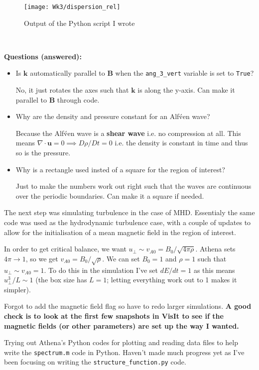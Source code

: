 \documentclass[12pt,letterpaper]{article}
\newcommand{\B}[1]{\mathbf{#1}}
\begin{document}
  \begin{figure}[!h]
    \centering
    \texttt{[image: Wk3/dispersion\_rel]}
    \caption{Output of the Python script I wrote}
    \label{fig:disp_rel}
  \end{figure}

  \

  \textbf{Questions (answered):}
  \begin{itemize}
    \item Is $\B{k}$ automatically parallel to $\B{B}$ when the \verb|ang_3_vert| variable is set to \verb|True|?

    No, it just rotates the axes such that $\B{k}$ is along the y-axis. Can make it parallel to $\B{B}$ through code.

    \item Why are the density and pressure constant for an Alf\'ven wave?

    Because the Alf\'ven wave is a \textbf{shear wave} i.e. no compression at all. This means $\nabla\cdot\B{u}=0 \implies D\rho/Dt = 0$ i.e. the density is constant in time and thus so is the pressure.

    \item Why is a rectangle used insted of a square for the region of interest?

    Just to make the numbers work out right such that the waves are continuous over the periodic boundaries. Can make it a square if needed.
  \end{itemize}

  The next step was simulating turbulence in the case of MHD. Essentialy the same code was used as the hydrodynamic turbulence case, with a couple of updates to allow for the initialisation of a mean magnetic field in the region of interest.

  In order to get critical balance, we want $u_\perp \sim v_{A0} = B_0/\sqrt{4\pi\rho}$. Athena sets $4\pi\to 1$, so we get $v_{A0} = B_0/\sqrt{\rho}$. We can set $B_0=1$ and $\rho=1$ such that $u_\perp \sim v_{A0}=1$. To do this in the simulation I've set $dE/dt=1$ as this means $u^3_\perp/L \sim 1$ (the box size has $L=1$; letting everything work out to 1 makes it simpler).

  Forgot to add the magnetic field flag so have to redo larger simulations. \textbf{A good check is to look at the first few snapshots in VisIt to see if the magnetic fields (or other parameters) are set up the way I wanted.}

  Trying out Athena's Python codes for plotting and reading data files to help write the \verb|spectrum.m| code in Python. Haven't made much progress yet as I've been focusing on writing the \verb|structure_function.py| code.
\end{document}
